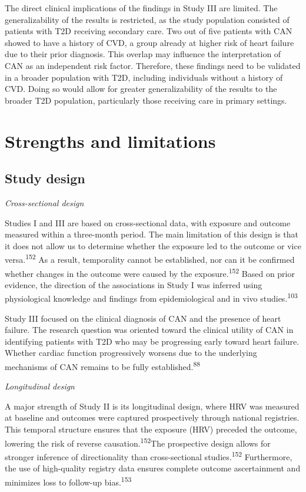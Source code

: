\documentclass[
  a4paper,
  headsepline=true,
  open=left]{scrbook}
\begin{document}
The direct clinical implications of the findings in Study III are
limited. The generalizability of the results is restricted, as the study
population consisted of patients with T2D receiving secondary care. Two
out of five patients with CAN showed to have a history of CVD, a group
already at higher risk of heart failure due to their prior diagnosis.
This overlap may influence the interpretation of CAN as an independent
risk factor. Therefore, these findings need to be validated in a broader
population with T2D, including individuals without a history of CVD.
Doing so would allow for greater generalizability of the results to the
broader T2D population, particularly those receiving care in primary
settings.

\hypertarget{strengths-and-limitations}{%
\section{Strengths and limitations}\label{strengths-and-limitations}}

\hypertarget{study-design}{%
\subsection{Study design}\label{study-design}}

\emph{Cross-sectional design}

Studies I and III are based on cross-sectional data, with exposure and
outcome measured within a three-month period. The main limitation of
this design is that it does not allow us to determine whether the
exposure led to the outcome or vice versa.\textsuperscript{152} As a
result, temporality cannot be established, nor can it be confirmed
whether changes in the outcome were caused by the
exposure.\textsuperscript{152} Based on prior evidence, the direction of
the associations in Study I was inferred using physiological knowledge
and findings from epidemiological and in vivo
studies.\textsuperscript{103}

Study III focused on the clinical diagnosis of CAN and the presence of
heart failure. The research question was oriented toward the clinical
utility of CAN in identifying patients with T2D who may be progressing
early toward heart failure. Whether cardiac function progressively
worsens due to the underlying mechanisms of CAN remains to be fully
established.\textsuperscript{88}

\emph{Longitudinal design}

A major strength of Study II is its longitudinal design, where HRV was
measured at baseline and outcomes were captured prospectively through
national registries. This temporal structure ensures that the exposure
(HRV) preceded the outcome, lowering the risk of reverse
causation.\textsuperscript{152}The prospective design allows for
stronger inference of directionality than cross-sectional
studies.\textsuperscript{152} Furthermore, the use of high-quality
registry data ensures complete outcome ascertainment and minimizes loss
to follow-up bias.\textsuperscript{153}
\end{document}
